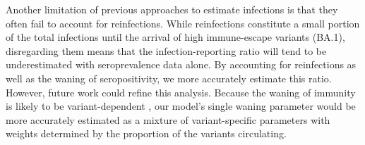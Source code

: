 Another limitation of previous approaches to estimate infections is that they
often fail to account for reinfections. While reinfections constitute a small
portion of the total infections until the arrival of high immune-escape variants
(BA.1), disregarding them means that the infection-reporting ratio will tend to
be underestimated with seroprevalence data alone. By accounting for reinfections
as well as the waning of seropositivity, we more accurately estimate this ratio.
However, future work could refine this analysis. Because the waning of immunity
is likely to be variant-dependent \citep{pooley2023durability}, our model's
single waning parameter would be more accurately estimated as a mixture of
variant-specific parameters with weights determined by the proportion of the
variants circulating. 

